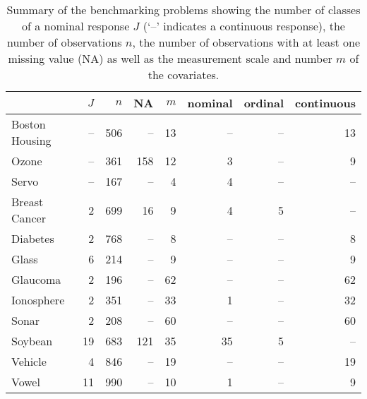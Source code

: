 
\begin{table}[t]
\begin{center}
\begin{tabular}{lrrrrrrr}
               & $J$ & $n$   & NA  & $m$  & nominal & ordinal & continuous \\ \hline
Boston Housing & -- & 506 & --  & 13 & --       & --       & 13    \\
Ozone          & -- & 361 & 158 & 12 & 3      & --       & 9     \\
Servo          & -- & 167 & --  & 4  & 4       & --       & -- \\ \hline
Breast Cancer  & 2 & 699 & 16 & 9  & 4       & 5       & --     \\
Diabetes       & 2 & 768 & --  & 8  & --       & --       & 8     \\
Glass          & 6 & 214 & --  & 9  & --       & --       & 9     \\
Glaucoma       & 2 & 196 & --  & 62 & --       & --       & 62    \\
Ionosphere     & 2 & 351 & --  & 33 & 1       & --       & 32    \\
Sonar          & 2 & 208 & --  & 60 & --       & --       & 60    \\
Soybean        & 19 & 683 & 121 & 35 & 35    & 5       & --     \\
Vehicle        & 4  & 846 & -- & 19 & --       & --       & 19    \\
Vowel          & 11 & 990 & -- & 10 & 1       & --       & 9     \\
\end{tabular}
\caption{Summary of the benchmarking problems showing the number of classes
of a nominal response $J$ (`--' indicates a continuous response), the number
of observations $n$, the number of observations 
with at least one missing value (NA) as well as the measurement
scale and number $m$ of the covariates. \label{benchdata}}
\end{center}
\end{table}
